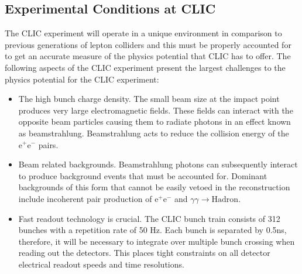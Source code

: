 

\subsection{Experimental Conditions at CLIC}

The CLIC experiment will operate in a unique environment in comparison to previous generations of lepton colliders and this must be properly accounted for to get an accurate measure of the physics potential that CLIC has to offer.  The following aspects of the CLIC experiment present the largest challenges to the physics potential for the CLIC experiment:

\begin{itemize}
\item The high bunch charge density.  The small beam size at the impact point produces very large electromagnetic fields.  These fields can interact with the opposite beam particles causing them to radiate photons in an effect known as beamstrahlung.  Beamstrahlung acts to reduce the collision energy of the $\text{e}^{+}\text{e}^{-}$ pairs.   
\item Beam related backgrounds.  Beamstrahlung photons can subsequently interact to produce background events that must be accounted for.  Dominant backgrounds of this form that cannot be easily vetoed in the reconstruction include incoherent pair production of $\text{e}^{+}\text{e}^{-}$ and $\gamma\gamma \rightarrow \text{Hadron}$.  
\item Fast readout technology is crucial.  The CLIC bunch train consists of 312 bunches with a repetition rate of 50 Hz.  Each bunch is separated by 0.5ns, therefore, it will be necessary to integrate over multiple bunch crossing when reading out the detectors.  This places tight constraints on all detector electrical readout speeds and time resolutions.   
\end{itemize}

